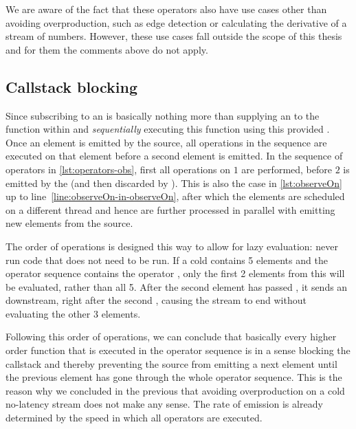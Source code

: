 We are aware of the fact that these operators also have use cases other than avoiding overproduction, such as edge detection or calculating the derivative of a stream of numbers. However, these use cases fall outside the scope of this thesis and for them the comments above do not apply.

\subsection{Callstack blocking}
Since subscribing to an \obs is basically nothing more than supplying an \obv to the function within  and \emph{sequentially} executing this function using this provided \obv. Once an element is emitted by the source, all operations in the \obs sequence are executed on that element before a second element is emitted. In the sequence of operators in \autoref{lst:operators-obs}, first all operations on $1$ are performed, before $2$ is emitted by the \obs (and then discarded by ). This is also the case in \autoref{lst:observeOn} up to line~\ref{line:observeOn-in-observeOn}, after which the elements are scheduled on a different thread and hence are further processed in parallel with emitting new elements from the source.

The order of operations is designed this way to allow for lazy evaluation: never run code that does not need to be run. If a cold \obs contains 5 elements and the operator sequence contains the operator , only the first 2 elements from this \obs will be evaluated, rather than all 5. After the second element has passed , it sends an  downstream, right after the second , causing the stream to end without evaluating the other 3 elements.

Following this order of operations, we can conclude that basically every higher order function that is executed in the operator sequence is in a sense blocking the callstack and thereby preventing the source from emitting a next element until the previous element has gone through the whole operator sequence. This is the reason why we concluded in the previous that avoiding overproduction on a cold no-latency stream does not make any sense. The rate of emission is already determined by the speed in which all operators are executed.

